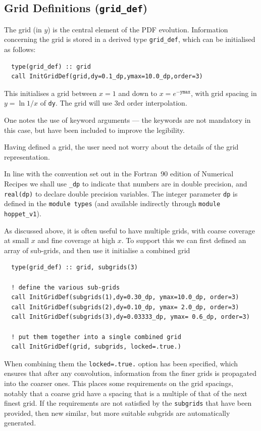 \documentclass[12pt]{article}
\newcommand{\ttt}[1]{\texttt{#1}}
\begin{document}
\subsection{Grid Definitions (\texttt{grid\_def})}
\label{sec:grid}

The grid (in $y$) is the central element of the PDF evolution.
Information concerning the grid is stored in a derived type
\texttt{grid\_def}, which can be initialised as follows:
\begin{verbatim}
  type(grid_def) :: grid
  call InitGridDef(grid,dy=0.1_dp,ymax=10.0_dp,order=3)
\end{verbatim}
This initialises a grid between $x=1$ and down to $x =
e^{-\texttt{ymax}}$, with grid spacing in $y = \ln 1/x$ of
\texttt{dy}. The grid will use 3rd order interpolation.

One notes the use of keyword arguments --- the keywords are not
mandatory in this case, but have been included to improve the
legibility. 

Having defined a grid, the user need not worry about the details of
the grid representation.

In line with the convention set out in the Fortran~90 edition of
Numerical Recipes \cite{NRf90} we shall use \texttt{\_dp} to indicate
that numbers are in double precision, and \ttt{real(dp)} to declare
double precision variables. The integer parameter \ttt{dp} is defined
in the \texttt{module types} (and available indirectly through
\ttt{module hoppet\_v1}).

As discussed above, it is often useful to have multiple grids, with
coarse coverage at small $x$ and fine coverage at high $x$. To support
this we can first defined an array of sub-grids, and then use it
initialise a combined grid
\begin{verbatim}
  type(grid_def) :: grid, subgrids(3)

  ! define the various sub-grids
  call InitGridDef(subgrids(1),dy=0.30_dp, ymax=10.0_dp, order=3)
  call InitGridDef(subgrids(2),dy=0.10_dp, ymax= 2.0_dp, order=3)
  call InitGridDef(subgrids(3),dy=0.03333_dp, ymax= 0.6_dp, order=3)

  ! put them together into a single combined grid
  call InitGridDef(grid, subgrids, locked=.true.)
\end{verbatim}
When combining them the \ttt{locked=.true.} option has been specified,
which ensures that after any convolution, information from the finer
grids is propagated into the coarser ones. This places some
requirements on the grid spacings, notably that a coarse grid have a
spacing that is a multiple of that of the next finest grid. If the
requirements are not satisfied by the \ttt{subgrids} that have been
provided, then new similar, but more suitable subgrids are
automatically generated. 
\end{document}
